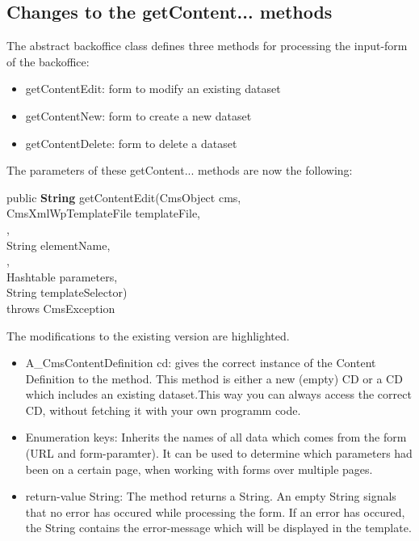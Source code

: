 \subsection{Changes to the getContent... methods}
The abstract backoffice class defines three methods for processing the 
input-form of the backoffice:

\begin{itemize}
\item getContentEdit: form to modify an existing dataset
\item getContentNew:  form to create a new dataset
\item getContentDelete: form to delete a dataset
\end{itemize}

The parameters of these getContent... methods are now the following:

\begin{java}
public {\bf String} getContentEdit(CmsObject cms,\\
\jtabf CmsXmlWpTemplateFile templateFile,\\
,\\
\jtabf String elementName,\\
,\\
\jtabf Hashtable parameters,\\
\jtabf String templateSelector)\\
\jtabf throws CmsException
\end{java}
The modifications to the existing version are highlighted.

\begin{itemize}
\item A\_CmsContentDefinition cd: gives the correct instance of the Content Definition
    to the method. This method is either a new (empty) CD or a CD which includes
    an existing dataset.This way you can always access the correct CD, without 
    fetching it with your own programm code.
\item Enumeration keys: Inherits the names of all data which comes from the form
    (URL and form-paramter). It can be used to determine which parameters had 
    been on a certain page, when working with forms over multiple pages.
\item return-value String: The method returns a String. An empty String signals that
    no error has occured while processing the form. If an error has occured, the 
    String contains the error-message which will be displayed in the template.
\end{itemize}

